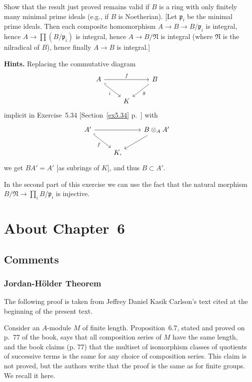 \documentclass[12pt,letterpaper]{article}%
\newcommand{\mf}{\mathfrak}
\newcommand{\ppp}{\mf p}
\newcommand{\NNN}{\mf N}\newcommand{\RRR}{\mf R}
\newcommand{\nn}{\noindent}
\begin{document}
Show that the result just proved remains valid if $B$ is a ring with only finitely many minimal prime ideals (e.g., if $B$ is Noetherian). [Let $\ppp_i$ be the minimal prime ideals. Then each composite homomorphism $A\to B\to B/\ppp_i$ is integral, hence $A\to\prod (B/\ppp_i)$ is integral, hence $A\to B/\NNN$ is integral (where $\NNN$ is the nilradical of $B$), hence finally $A\to B$ is integral.]

\nn\textbf{Hints.} Replacing the commutative diagram 
$$
\begin{tikzcd}
A\ar[dr,hook,"i"']\ar[rr,"f"]&&B\ar[dl,"g"]\\ 
&K
\end{tikzcd}
$$ 
implicit in Exercise~5.34 [Section~\ref{ex5.34} p.~\pageref{ex5.34}] with 
$$
\begin{tikzcd}
A'\ar[dr,hook,"f"']\ar[rr]&&B\otimes_AA'\ar[dl]\\ 
&K,
\end{tikzcd}
$$ 
we get $BA'=A'$ [as subrings of $K$], and thus $B\subset A'$.

In the second part of this exercise we can use the fact that the natural morphism $B/\NNN\to\prod_iB/\ppp_i$ is injective.

\newpage

\section{About Chapter~6}%

\subsection{Comments}%

\subsubsection{Jordan-Hölder Theorem}%

The following proof is taken from Jeffrey Daniel Kasik Carlson's text cited at the beginning of the present text. 

Consider an $A$-module $M$ of finite length. Proposition~6.7, stated and proved on p.~77 of the book, says that all composition series of $M$ have the same length, and the book claims (p. 77) that the multiset of isomorphism classes of quotients of successive terms is the same for any choice of composition series. This claim is not proved, but the authors write that the proof is the same as for finite groups. We recall it here. 
\end{document}
